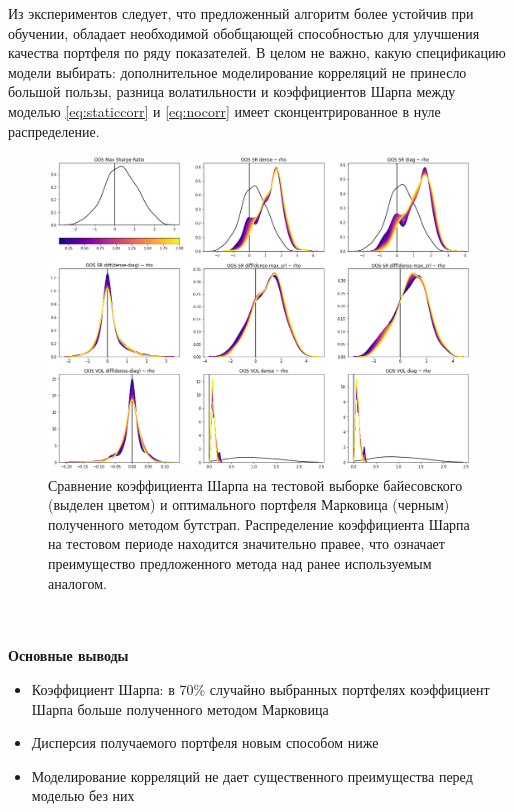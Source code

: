 Из экспериментов следует, что предложенный алгоритм более устойчив при обучении, обладает необходимой обобщающей способностью для улучшения качества портфеля по ряду показателей. В целом не важно, какую спецификацию модели выбирать: дополнительное моделирование корреляций не принесло большой пользы, разница волатильности и коэффициентов Шарпа между моделью \eqref{eq:staticcorr} и \eqref{eq:nocorr} имеет сконцентрированное в нуле распределение.
\begin{figure}[h]
	\centering
	\includegraphics[width=\linewidth]{Thesis/images/performance}
	\caption{Сравнение коэффициента Шарпа на тестовой выборке байесовского (выделен цветом) и оптимального портфеля Марковица (черным) полученного методом бутстрап. Распределение коэффициента Шарпа на тестовом периоде находится значительно правее, что означает преимущество предложенного метода над ранее используемым аналогом. }
	\label{fig:performance}
\end{figure}
\\\\
\textbf{Основные выводы}
\begin{itemize}
	\item Коэффициент Шарпа: в 70\% случайно выбранных портфелях коэффициент Шарпа больше полученного методом Марковица
	\item Дисперсия получаемого портфеля новым способом ниже
	\item Моделирование корреляций не дает существенного преимущества перед моделью без них
\end{itemize}

